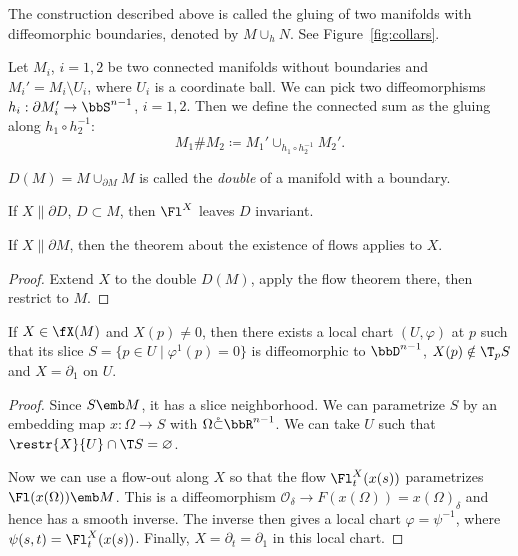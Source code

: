 \begin{defn}
    The construction described above is called the gluing of two manifolds with diffeomorphic boundaries, denoted by $M\cup_h N$. See Figure~\ref{fig:collars}.
\end{defn}

\begin{defn}
    Let $M_i$, $i=1,2$ be two connected manifolds without boundaries and $M_i'=M_i\setminus U_i$, where $U_i$ is a coordinate ball. We can pick two diffeomorphisms $h_i:\partial M_i'\to \bbS^{n-1}$, $i=1,2$. Then we define the connected sum as the gluing along $h_1\circ h_2^{-1}$:
    \[M_1 \# M_2\coloneqq M_1'\cup_{h_1\circ h_2^{-1}}M_2'.\]
\end{defn}
\begin{example}
    $D(M)=M\cup_{\partial M}M$ is called the \emph{double} of a manifold with a boundary.
\end{example}
\begin{example}
    If $X\parallel \partial D$, $D\subset M$, then $\Fl^X$ leaves $D$ invariant.
\end{example}
\begin{cor}
    If $X\parallel \partial M$, then the theorem about the existence of flows applies to $X$.
\end{cor}
\begin{proof}
    Extend $X$ to the double $D(M)$, apply the flow theorem there, then restrict to $M$.
\end{proof}

\begin{thm}\label{rectification}
If $X\in\fX(M)$ and $X(p)\neq 0$, then there exists a local chart $(U,\varphi)$ at $p$ such that its slice $S=\{p\in U\mid \varphi^1(p)=0\}$ is diffeomorphic to $\bbD^{n-1}$, $X(p)\notin \T_p S$ and $X=\partial_1$ on $U$.
\end{thm}
\begin{proof}
    Since $S\emb M$, it has a slice neighborhood. We can parametrize $S$ by an embedding map $x:\Omega\to S$ with $\Omega\mathring{\subset}\bbR^{n-1}$. We can take $U$ such that $\restr{X}{U}\cap \T S=\varnothing$. 

    Now we can use a flow-out along $X$ so that the flow $\Fl^X_t(x(s))$ parametrizes $\Fl(x(\Omega))\emb M$. This is a diffeomorphism $\mathcal{O}_\delta\to F(x(\Omega))=x(\Omega)_\delta$ and hence has a smooth inverse. The inverse then gives a local chart $\varphi=\psi^{-1}$, where $\psi(s,t)=\Fl^X_t(x(s))$. Finally, $X=\partial_t=\partial_1$ in this local chart.
\end{proof}

